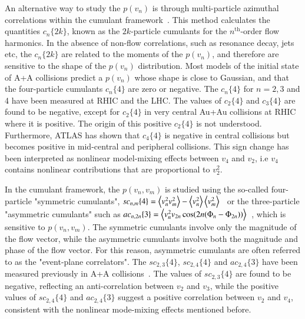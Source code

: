 An alternative way to study the $p(v_n)$ is through multi-particle azimuthal correlations within the cumulant framework~\cite{Borghini:2000sa, Bilandzic:2010jr}. This method calculates the quantities $c_n\{2k\}$, known as the $2k$-particle cumulants for the $n^\text{th}$-order flow harmonics. In the absence of non-flow correlations, such as resonance decay, jets etc, the $c_n\{2k\}$ are related to the moments of the $p(v_n)$, and therefore are sensitive to the shape of the $p(v_n)$ distribution. Most models of the initial state of A+A collisions predict a $p(v_n)$ whose shape is close to Gaussian, and that the four-particle cumulants $c_n\{4\}$ are zero or negative. The $c_n\{4\}$ for $n=2,3$ and 4 have been measured at RHIC and the LHC. The values of $c_2\{4\}$ and $c_3\{4\}$ are found to be negative, except for $c_2\{4\}$ in very central Au+Au collisions at RHIC where it is positive. The origin of this positive $c_2\{4\}$ is not understood. Furthermore, ATLAS has shown that $c_4\{4\}$ is negative in central collisions but becomes positive in mid-central and peripheral collisions. This sign change has been interpreted as nonlinear model-mixing effects between $v_4$ and $v_2$, i.e $v_4$ contains nonlinear contributions that are proportional to $v_2^2$.

In the cumulant framework, the $p(v_n,v_m)$ is studied using the so-called four-particle "symmetric cumulants", $sc_{n,m}\{4\}=\left\langle v_n^2 v_m^2\right\rangle-\left\langle v_n^2\right\rangle\left\langle v_m^2\right\rangle$~\cite{Bilandzic:2013kga} or the three-particle "asymmetric cumulants" such as $ac_{n,2n}\{3\}=\left\langle v_n^2 v_{2n} \cos(2n(\Phi_n-\Phi_{2n}))\right\rangle$~\cite{Jia:2017hbm}, which is sensitive to $p(v_n,v_m)$. The symmetric cumulants involve only the magnitude of the flow vector, while the asymmetric cumulants involve both the magnitude and phase of the flow vector. For this reason, asymmetric cumulants are often referred to as the "event-plane correlators". The $sc_{2,3}\{4\}$, $sc_{2,4}\{4\}$ and $ac_{2,4}\{3\}$ have been measured previously in A+A collisions~\cite{ALICE:2016kpq}. The values of $sc_{2,3}\{4\}$ are found to be negative, reflecting an anti-correlation between $v_2$ and $v_3$, while the positive values of $sc_{2,4}\{4\}$ and $ac_{2,4}\{3\}$ suggest a positive correlation between $v_2$ and $v_4$, consistent with the nonlinear mode-mixing effects mentioned before.

